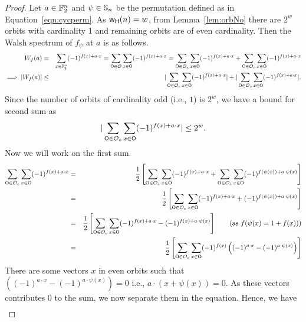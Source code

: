 \documentclass{llncs}
\begin{document}
\begin{proof}
Let $a \in \mathbb{F}_2^n$ and $\psi \in \mathbb{S}_n$ be the permutation defined as in Equation~\ref{eqn:cycperm}.
As $\mathsf{w_H}(n) = w$, from Lemma~\ref{lem:orbNo} there are $2^w$ orbits with cardinality $1$ and remaining orbits are of even cardinality. 
Then the Walsh spectrum of $f_\psi$ at $a$ is as follows.
\begin{eqnarray} \label{eqn:ws}
W_{f}(a) & =  &\sum_{x \in \mathbb{F}_2^n} (-1)^{f(x)+a \cdot x} 
= \sum_{\mathsf{O} \in \mathcal{O}} \sum_{x \in \mathsf{O}} (-1)^{f(x)+ a \cdot x}
= \sum_{\mathsf{O} \in \mathcal{O}_e} \sum_{x \in \mathsf{O}} (-1)^{ f(x) + a \cdot x} + \sum_{\mathsf{O} \in \mathcal{O}_o} \sum_{x \in \mathsf{O}} (-1)^{ f(x) + a \cdot x} \nonumber \\
\implies |W_{f}(a)| & \leq  & |\sum_{\mathsf{O} \in \mathcal{O}_e} \sum_{x \in \mathsf{O}} (-1)^{ f(x) + a \cdot x}| + | \sum_{\mathsf{O} \in \mathcal{O}_o} \sum_{x \in \mathsf{O}} (-1)^{ f(x) + a \cdot x}|.
\end{eqnarray}
Since the number of orbits of cardinality odd (i.e., $1$) is $2^w$, we have a bound for second sum  as 
\begin{equation}\label{eqn:sumo}
|\sum_{\mathsf{O} \in \mathcal{O}_o} \sum_{x \in \mathsf{O}} (-1)^{ f(x) + a \cdot x}| \leq 2^w. 
\end{equation}
Now we will work on the first sum.
\begin{eqnarray*}
\sum_{\mathsf{O} \in \mathcal{O}_e} \sum_{x \in \mathsf{O}} (-1)^{ f(x) + a \cdot x}  
& = & \frac{1}{2} \left[ \sum_{\mathsf{O} \in \mathcal{O}_e} \sum_{x \in \mathsf{O}} (-1)^{ f(x) + a \cdot x} + \sum_{\mathsf{O} \in \mathcal{O}_e} \sum_{x \in \mathsf{O}} (-1)^{ f(\psi(x)) + a \cdot \psi(x)} \right] \\
& = & \frac{1}{2} \left[ \sum_{\mathsf{O} \in \mathcal{O}_e} \sum_{x \in \mathsf{O}} (-1)^{ f(x) + a \cdot x} + (-1)^{f(\psi(x))+ a \cdot \psi(x)}   \right]  \\
& = & \frac{1}{2}  \left[ \sum_{\mathsf{O} \in \mathcal{O}_e} \sum_{x \in \mathsf{O}} (-1)^{ f(x) + a \cdot x} - (-1)^{f(x) + a \cdot \psi(x)}   \right] ~~~~~~(\text{as }f(\psi(x) = 1+f(x)))\\
& = & \frac{1}{2} \left[ \sum_{\mathsf{O} \in \mathcal{O}_e} \sum_{x \in \mathsf{O}} (-1)^{ f(x)} \left((-1)^{a \cdot x} - (-1)^{ a \cdot \psi(x)}\right) \right]
\end{eqnarray*}
There are some vectors $x$ in even orbits such that $((-1)^{ a \cdot x} - (-1)^{a \cdot \psi(x)}) = 0 $ i.e., $a \cdot (x + \psi(x))= 0$. As these vectors contributes $0$ to the sum, we now separate them in the equation. Hence, we have
\begin{eqnarray*}

\end{eqnarray*}
\end{proof}
\end{document}
